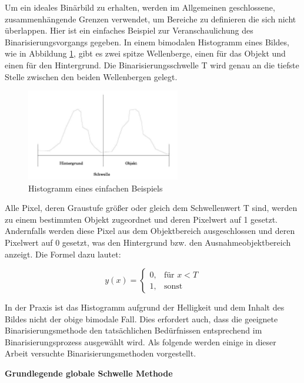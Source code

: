 Um ein ideales Binärbild zu erhalten, werden im Allgemeinen geschlossene, zusammenhängende Grenzen verwendet, um Bereiche zu definieren die sich nicht überlappen. Hier ist ein einfaches Beispiel zur Veranschaulichung des Binarisierungsvorgangs gegeben. In einem bimodalen Histogramm eines Bildes, wie in Abbildung \ref{fig:Histogramm eines einfachen Beispiels}, gibt es zwei spitze Wellenberge, einen für das Objekt und einen für den Hintergrund. Die Binarisierungsschwelle T wird genau an die tiefste Stelle zwischen den beiden Wellenbergen gelegt. 

\begin{figure}[htb]
 \centering 
  \includegraphics[keepaspectratio,width=0.6\textwidth]{images/4_ZweiteErfahrung/Binar/binar.pdf}
 \caption{Histogramm eines einfachen Beispiels}
 \label{fig:Histogramm eines einfachen Beispiels}
\end{figure} 

Alle Pixel, deren Graustufe größer oder gleich dem Schwellenwert T sind, werden zu einem bestimmten Objekt zugeordnet und deren Pixelwert auf 1 gesetzt. Andernfalls werden diese Pixel aus dem Objektbereich ausgeschlossen und deren Pixelwert auf 0 gesetzt, was den Hintergrund bzw. den Ausnahmeobjektbereich anzeigt. Die Formel dazu lautet:

\begin{equation}
  y(x) =
  \begin{cases} 
  0,   & \mbox{für }x < T \\
  1, & \mbox{sonst}
  \end{cases}
\end{equation}

In der Praxis ist das Histogramm aufgrund der Helligkeit und dem Inhalt des Bildes nicht der obige bimodale Fall. Dies erfordert auch, dass die geeignete Binarisierungsmethode den tatsächlichen Bedürfnissen entsprechend im Binarisierungsprozess ausgewählt wird. Als folgende werden einige in dieser Arbeit versuchte Binarisierungsmethoden vorgestellt.

\textbf{Grundlegende globale Schwelle Methode}

